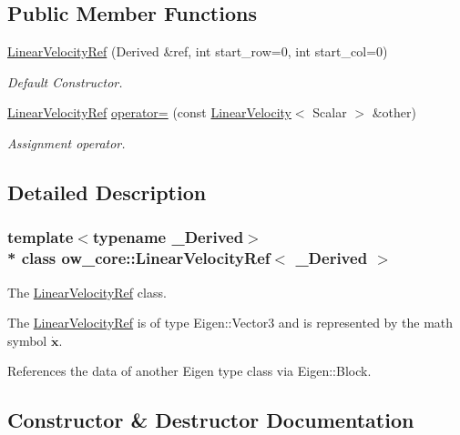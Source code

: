 \subsection*{Public Member Functions}
\begin{DoxyCompactItemize}
\item 
\hyperlink{classow__core_1_1LinearVelocityRef_acb5a5fb218b92a7ac9a18738342a9ab7}{Linear\+Velocity\+Ref} (Derived \&ref, int start\+\_\+row=0, int start\+\_\+col=0)
\begin{DoxyCompactList}\small\item\em Default Constructor. \end{DoxyCompactList}\item 
\hyperlink{classow__core_1_1LinearVelocityRef}{Linear\+Velocity\+Ref} \hyperlink{classow__core_1_1LinearVelocityRef_a901fc32daff106ca502a0cc808f31323}{operator=} (const \hyperlink{classow__core_1_1LinearVelocity}{Linear\+Velocity}$<$ Scalar $>$ \&other)\hypertarget{classow__core_1_1LinearVelocityRef_a901fc32daff106ca502a0cc808f31323}{}\label{classow__core_1_1LinearVelocityRef_a901fc32daff106ca502a0cc808f31323}

\begin{DoxyCompactList}\small\item\em Assignment operator. \end{DoxyCompactList}\end{DoxyCompactItemize}


\subsection{Detailed Description}
\subsubsection*{template$<$typename \+\_\+\+Derived$>$\\*
class ow\+\_\+core\+::\+Linear\+Velocity\+Ref$<$ \+\_\+\+Derived $>$}

The \hyperlink{classow__core_1_1LinearVelocityRef}{Linear\+Velocity\+Ref} class. 

The \hyperlink{classow__core_1_1LinearVelocityRef}{Linear\+Velocity\+Ref} is of type Eigen\+::\+Vector3 and is represented by the math symbol $\dot{\mathbf{x}}$.

References the data of another Eigen type class via Eigen\+::\+Block. 

\subsection{Constructor \& Destructor Documentation}
